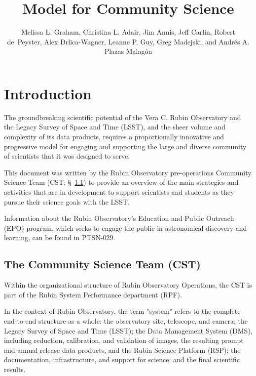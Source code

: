 \documentclass[DM,authoryear,toc]{lsstdoc}
\title{Model for Community Science}
\author{%
Melissa L. Graham, Christina L. Adair, Jim Annis, Jeff Carlin, Robert de~Peyster, Alex Drlica-Wagner, Leanne P. Guy, Greg Madejski, and Andr\'es A. Plazas Malag\'on
}
\date{\vcsDate}
\begin{document}
\maketitle



\section{Introduction}\label{sec:intro}

The groundbreaking scientific potential of the Vera C. Rubin Observatory and the Legacy Survey of Space and Time (LSST), and the sheer volume and complexity of its data products, requires a proportionally innovative and progressive model for engaging and supporting the large and diverse community of scientists that it was designed to serve. 

This document was written by the Rubin Observatory pre-operations Community Science Team (CST; \S~\ref{sec:intro_org}) to provide an overview of the main strategies and activities that are in development to support scientists and students as they pursue their science goals with the LSST. 

Information about the Rubin Observatory's Education and Public Outreach (EPO) program, which seeks to engage the public in astronomical discovery and learning, can be found in PTSN-029. %


\subsection{The Community Science Team (CST)}\label{sec:intro_org}

Within the organizational structure of Rubin Observatory Operations, the CST is part of the Rubin System Performance department (RPF).

In the context of Rubin Observatory, the term "system" refers to the complete end-to-end structure as a whole: the observatory site, telescope, and camera; the Legacy Survey of Space and Time (LSST); the Data Management System (DMS), including reduction, calibration, and validation of images, the resulting prompt and annual release data products, and the Rubin Science Platform (RSP); the documentation, infrastructure, and support for science; and the final scientific results. 
\end{document}
